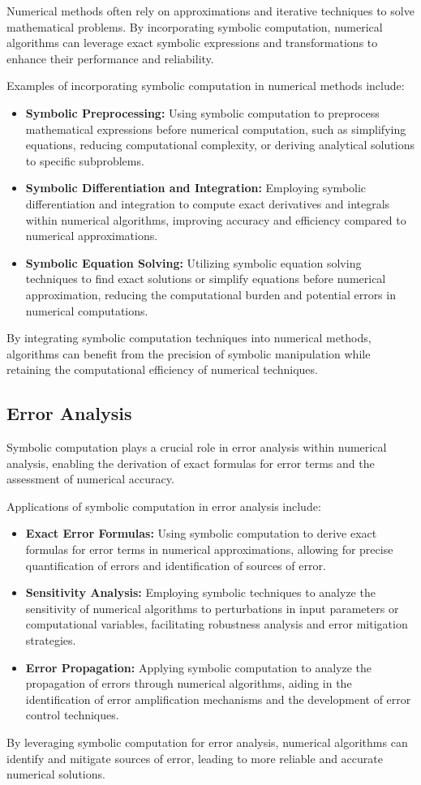 Numerical methods often rely on approximations and iterative techniques to solve mathematical problems. By incorporating symbolic computation, numerical algorithms can leverage exact symbolic expressions and transformations to enhance their performance and reliability.

Examples of incorporating symbolic computation in numerical methods include:
%
\begin{itemize}
  \item \textbf{Symbolic Preprocessing:} Using symbolic computation to preprocess mathematical expressions before numerical computation, such as simplifying equations, reducing computational complexity, or deriving analytical solutions to specific subproblems.
  \item \textbf{Symbolic Differentiation and Integration:} Employing symbolic differentiation and integration to compute exact derivatives and integrals within numerical algorithms, improving accuracy and efficiency compared to numerical approximations.
  \item \textbf{Symbolic Equation Solving:} Utilizing symbolic equation solving techniques to find exact solutions or simplify equations before numerical approximation, reducing the computational burden and potential errors in numerical computations.
\end{itemize}

By integrating symbolic computation techniques into numerical methods, algorithms can benefit from the precision of symbolic manipulation while retaining the computational efficiency of numerical techniques.

\subsection{Error Analysis}

Symbolic computation plays a crucial role in error analysis within numerical analysis, enabling the derivation of exact formulas for error terms and the assessment of numerical accuracy.

Applications of symbolic computation in error analysis include:
%
\begin{itemize}
  \item \textbf{Exact Error Formulas:} Using symbolic computation to derive exact formulas for error terms in numerical approximations, allowing for precise quantification of errors and identification of sources of error.
  \item \textbf{Sensitivity Analysis:} Employing symbolic techniques to analyze the sensitivity of numerical algorithms to perturbations in input parameters or computational variables, facilitating robustness analysis and error mitigation strategies.
  \item \textbf{Error Propagation:} Applying symbolic computation to analyze the propagation of errors through numerical algorithms, aiding in the identification of error amplification mechanisms and the development of error control techniques.
\end{itemize}
%
By leveraging symbolic computation for error analysis, numerical algorithms can identify and mitigate sources of error, leading to more reliable and accurate numerical solutions.

